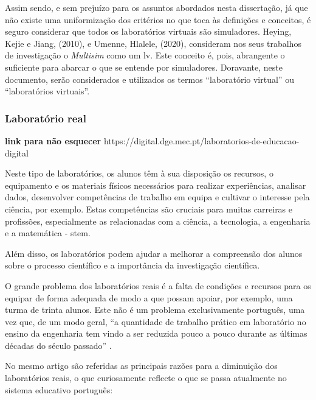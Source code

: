 Assim sendo, e sem prejuízo para os assuntos abordados nesta dissertação, já que não existe uma uniformização dos critérios no que toca às definições e conceitos, é seguro considerar que todos os laboratórios virtuais são simuladores. Heying, Kejie e Jiang, (2010), \cite{multisimVLHeying} e Umenne, Hlalele, (2020), \cite{multisimVLUmenne} consideram nos seus trabalhos de investigação o \textit{Multisim}\cite{multisim} como um \acrshort{lv}. Este conceito é, pois, abrangente o suficiente para abarcar o que se entende por simuladores. Doravante, neste documento, serão considerados e utilizados os termos ``laboratório virtual'' ou ``laboratórios virtuais''.

\subsubsection{Laboratório real}
\textbf{link para não esquecer}
https://digital.dge.mec.pt/laboratorios-de-educacao-digital

Neste tipo de laboratórios, os alunos têm à sua disposição os recursos, o equipamento e os materiais físicos necessários para realizar experiências, analisar dados, desenvolver competências de trabalho em equipa e cultivar o interesse pela ciência, por exemplo. Estas competências são cruciais para muitas carreiras e profissões, especialmente as relacionadas com a ciência, a tecnologia, a engenharia e a matemática - \acrshort{stem}.

Além disso, os laboratórios podem ajudar a melhorar a compreensão dos alunos sobre o processo científico e a importância da investigação científica.

O grande problema dos laboratórios reais é a falta de condições e recursos para os equipar de forma adequada de modo a que possam apoiar, por exemplo, uma turma de trinta alunos. Este não é um problema exclusivamente português, uma vez que, de um modo geral, ``a quantidade de trabalho prático em laboratório no ensino da engenharia tem vindo a ser reduzida pouco a pouco durante as últimas décadas do século passado'' \cite{PaperTit40:online}.

No mesmo artigo \cite{PaperTit40:online} são referidas as principais razões para a diminuição dos laboratórios reais, o que curiosamente reflecte o que se passa atualmente no sistema educativo português:

